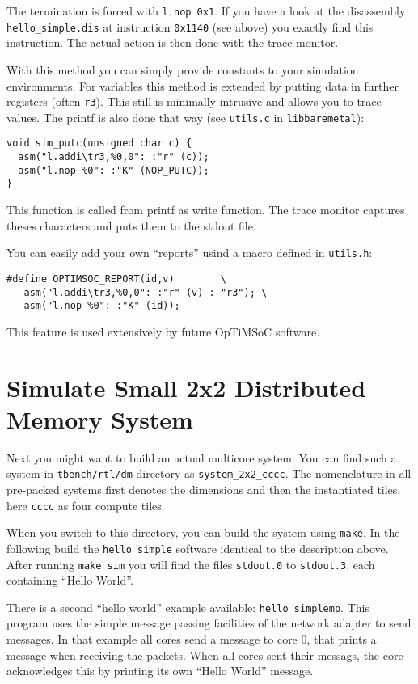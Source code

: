 The termination is forced with \verb|l.nop 0x1|. If you have a look at
the disassembly \verb|hello_simple.dis| at instruction \verb|0x1140|
(see above) you exactly find this instruction. The actual action is
then done with the trace monitor.

With this method you can simply provide constants to your simulation
environments. For variables this method is extended by putting data in
further registers (often \verb|r3|). This still is minimally intrusive
and allows you to trace values. The printf is also done that way (see
\verb|utils.c| in \verb|libbaremetal|):

\begin{verbatim}
void sim_putc(unsigned char c) {
  asm("l.addi\tr3,%0,0": :"r" (c));
  asm("l.nop %0": :"K" (NOP_PUTC));
}
\end{verbatim}

This function is called from printf as write function. The trace
monitor captures theses characters and puts them to the stdout file.

You can easily add your own ``reports'' usind a macro defined in
\verb|utils.h|:

\begin{verbatim}
#define OPTIMSOC_REPORT(id,v)        \
   asm("l.addi\tr3,%0,0": :"r" (v) : "r3"); \
   asm("l.nop %0": :"K" (id));
\end{verbatim}

This feature is used extensively by future OpTiMSoC software.

\section{Simulate Small 2x2 Distributed Memory System}

Next you might want to build an actual multicore system. You can find
such a system in \verb|tbench/rtl/dm| directory as
\verb|system_2x2_cccc|. The nomenclature in all pre-packed systems
first denotes the dimensions and then the instantiated tiles, here
\verb|cccc| as four compute tiles.

When you switch to this directory, you can build the system using
\verb|make|. In the following build the \verb|hello_simple| software
identical to the description above. After running \verb|make sim| you
will find the files \verb|stdout.0| to \verb|stdout.3|, each
containing ``Hello World''.

There is a second ``hello world'' example available:
\verb|hello_simplemp|. This program uses the simple message passing
facilities of the network adapter to send messages. In that example
all cores send a message to core 0, that prints a message when
receiving the packets. When all cores sent their messags, the core
acknowledges this by printing its own ``Hello World'' message.


